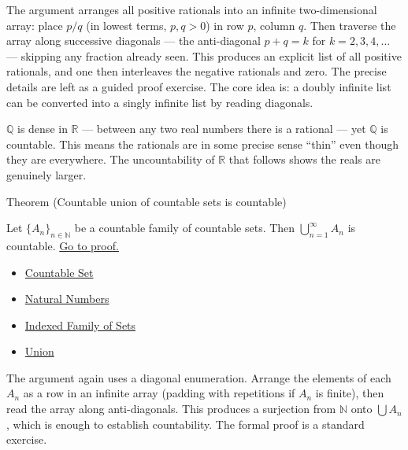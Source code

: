 \begin{remark*}
The argument arranges all positive rationals into an infinite two-dimensional
array: place $p/q$ (in lowest terms, $p,q > 0$) in row $p$, column $q$. Then
traverse the array along successive diagonals — the anti-diagonal $p + q = k$
for $k = 2, 3, 4, \dots$ — skipping any fraction already seen. This produces
an explicit list of all positive rationals, and one then interleaves the
negative rationals and zero. The precise details are left as a guided proof
exercise. The core idea is: a doubly infinite list can be converted into a
singly infinite list by reading diagonals.
\end{remark*}

\begin{remark*}
$\mathbb{Q}$ is dense in $\mathbb{R}$ — between any two real numbers there
is a rational — yet $\mathbb{Q}$ is countable. This means the rationals are
in some precise sense ``thin'' even though they are everywhere. The uncountability
of $\mathbb{R}$ that follows shows the reals are genuinely larger.
\end{remark*}

\begin{theorembox}{Theorem (Countable union of countable sets is countable)}
\begin{theorem}
\label{thm:countable-union}
Let $\{A_n\}_{n \in \mathbb{N}}$ be a countable family of countable sets.
Then $\bigcup_{n=1}^{\infty} A_n$ is countable.
\hyperref[prf:countable-union]{Go to proof.}
\end{theorem}
\end{theorembox}

\begin{dependencies}
\begin{itemize}
  \item \hyperref[def:countable]{Countable Set}
  \item \hyperref[def:natural-numbers]{Natural Numbers}
  \item \hyperref[def:indexed-family]{Indexed Family of Sets}
  \item \hyperref[def:union]{Union}
\end{itemize}
\end{dependencies}

\begin{remark*}
The argument again uses a diagonal enumeration. Arrange the elements of each
$A_n$ as a row in an infinite array (padding with repetitions if $A_n$ is
finite), then read the array along anti-diagonals. This produces a surjection
from $\mathbb{N}$ onto $\bigcup A_n$, which is enough to establish
countability. The formal proof is a standard exercise.
\end{remark*}

